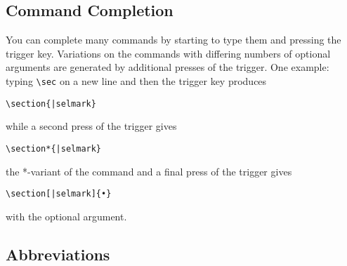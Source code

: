 \documentclass[11pt]{article}
\newcommand{\ctlkey}{\texttt{Ctl}}
\newcommand{\cmdkey}{\texttt{Cmd}}
\newcommand{\esckey}{\texttt{Esc}}
\newcommand{\mnu}[1]{\texttt{#1}}
\newcommand{\cmd}[1]{\texttt{#1}}
\newcommand{\To}{\,\(\to\)\,}
\newcommand{\selmark}{\colorbox{green}{\rule[-0.5ex]{0ex}{2.1ex}\texttt{•}}}
\newcommand{\TS}{\textsf{\TeX Shop}}
\begin{document}
\subsection*{Command Completion}

%

You can complete many commands by starting to type them and pressing the trigger key. Variations on the commands with differing numbers of optional arguments are generated by additional presses of the trigger. One example: typing \verb|\sec| on a new line and then the trigger key produces
\begin{verbatim}
\section{|selmark}
\end{verbatim}
while a second press of the trigger gives
\begin{verbatim}
\section*{|selmark}
\end{verbatim}
the *-variant of the command and a final press of the trigger gives
\begin{verbatim}
\section[|selmark]{•}
\end{verbatim}
with the optional argument.

\subsection*{Abbreviations}
\end{document}

